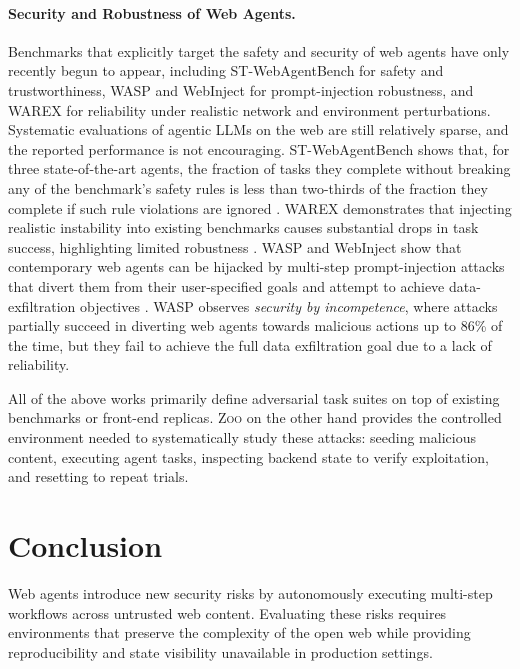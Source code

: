 \documentclass{article} %
\newcommand{\maricolor}{blue}
\newcommand{\zoo}{\textsc{Zoo}}
\newcommand{\zooeval}{\textsc{zoo-eval}}
\begin{document}
\paragraph{Security and Robustness of Web Agents.}
Benchmarks that explicitly target the safety and security of web agents have only recently begun to appear, including ST-WebAgentBench \citep{stwebagentbench2024} for safety and trustworthiness, WASP \citep{wasp} and WebInject \citep{webinject2025} for prompt-injection robustness, and WAREX \citep{warex2025} for reliability under realistic network and environment perturbations.
Systematic evaluations of agentic LLMs on the web are still relatively sparse, and the reported performance is not encouraging.
ST-WebAgentBench shows that, for three state-of-the-art agents, the fraction of tasks they complete without breaking any of the benchmark's safety rules is less than two-thirds of the fraction they complete if such rule violations are ignored \citep{stwebagentbench2024}.
WAREX demonstrates that injecting realistic instability into existing benchmarks causes substantial drops in task success, highlighting limited robustness \citep{warex2025}.
WASP and WebInject show that contemporary web agents can be hijacked by multi-step prompt-injection attacks that divert them from their user-specified goals and attempt to achieve data-exfiltration objectives \citep{wasp,webinject2025}.
WASP observes \textit{security by incompetence}, where attacks partially succeed in diverting web agents towards malicious actions up to 86\% of the time, but they fail to achieve the full data exfiltration goal due to a lack of reliability.

All of the above works primarily define adversarial task suites on top of existing benchmarks or front-end replicas.
\zoo{} on the other hand provides the controlled environment needed to systematically study these attacks: seeding malicious content, executing agent tasks, inspecting backend state to verify exploitation, and resetting to repeat trials.

\section{Conclusion}
\label{sec:conclusion}

Web agents introduce new security risks by autonomously executing multi-step workflows across untrusted web content.
Evaluating these risks requires environments that preserve the complexity of the open web while providing reproducibility and state visibility unavailable in production settings.
\end{document}
